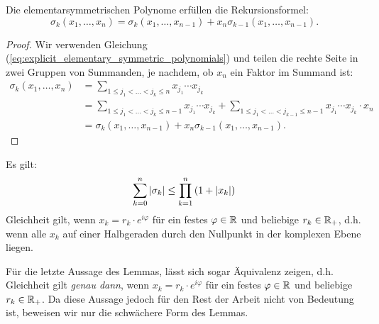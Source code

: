 \begin{lemma}
    \label{lemma:recursion_elementary_symmetric_polynomials}
    Die elementarsymmetrischen Polynome erfüllen die Rekursionsformel:
    \begin{equation}
        \label{eq:recursion_elementary_symmetric_polynomials}
        \sigma_k (x_1, \dots, x_{n}) = \sigma_k (x_1, \dots, x_{n-1}) + x_{n} \sigma_{k-1} (x_1, \dots, x_{n-1}).
    \end{equation}
\end{lemma}

\begin{proof}
    Wir verwenden Gleichung (\ref{eq:explicit_elementary_symmetric_polynomials})
    und teilen die rechte Seite in zwei Gruppen von Summanden, je nachdem, ob
    $x_n$ ein Faktor im Summand ist:
    \begin{equation*}
        \begin{split}
            \sigma_k (x_1, \dots, x_{n})
            &= \sum_{1 \leq j_1 < \dots < j_k \leq n} x_{j_1} \cdots x_{j_k}\\
            &= \sum_{1 \leq j_1 < \dots < j_k \leq n-1} x_{j_1} \cdots x_{j_k}
            + \sum_{1 \leq j_1 < \dots < j_{k-1} \leq n-1} x_{j_1} \cdots x_{j_k} \cdot x_{n}\\
            &= \sigma_k (x_1, \dots, x_{n-1}) + x_{n} \sigma_{k-1} (x_1, \dots, x_{n-1}).
        \end{split}
    \end{equation*}
\end{proof}

\begin{lemma}
    \label{lemma:elementary_symmetric_polynomials_inequality}
    Es gilt:
    \begin{equation}
        \label{eq:elementary_symmetric_polynomials_inequality}
        \sum_{k=0}^{n} \left\lvert \sigma_{k} \right\rvert \leq \prod_{k=1}^{n} \left( 1 + \left\lvert x_k \right\rvert \right)
    \end{equation}
    Gleichheit gilt, wenn $x_k = r_k \cdot e^{i\varphi}$ für ein
    festes $\varphi \in \mathbb{R}$ und beliebige $r_k \in \mathbb{R}_+$,
    d.h. wenn alle $x_k$ auf einer Halbgeraden durch den Nullpunkt
    in der komplexen Ebene liegen.
\end{lemma}

\begin{remark}
    Für die letzte Aussage des Lemmas, lässt sich sogar Äquivalenz zeigen, d.h.
    Gleichheit gilt \emph{genau dann}, wenn $x_k = r_k \cdot e^{i\varphi}$ für
    ein festes $\varphi \in \mathbb{R}$ und beliebige $r_k \in \mathbb{R}_+$.
    Da diese Aussage jedoch für den Rest der Arbeit nicht von Bedeutung ist,
    beweisen wir nur die schwächere Form des Lemmas.
\end{remark}

